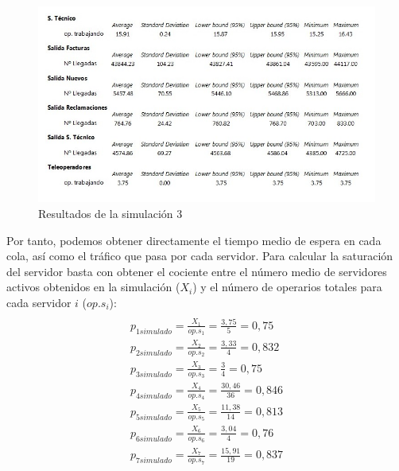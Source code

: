 \begin{figure}[H]
\begin{center}
\centering
  \includegraphics[width=1\textwidth]{./images/foto3}
  \caption{Resultados de la simulación 3}
  \label{fig: Resultados de la simulacion 3}
\end{center}
\end{figure}
Por tanto, podemos obtener directamente el tiempo medio de espera en cada cola, así como el tráfico que pasa por cada servidor. Para calcular la saturación del servidor basta con obtener el cociente entre el número medio de servidores activos obtenidos en la simulación ($X_{i}$) y el número de operarios totales para cada servidor $i$ ($op.s_{i}$):
\begin{multline}\\
p_{1 simulado} = \frac{X_{1}}{op.s_{1}} = \frac{3,75}{5} = 0,75 \\
p_{2 simulado} = \frac{X_{2}}{op.s_{2}} = \frac{3,33}{4} = 0,832\\
p_{3 simulado} = \frac{X_{3}}{op.s_{3}} = \frac{3}{4} = 0,75\\
p_{4 simulado} = \frac{X_{4}}{op.s_{4}} = \frac{30,46}{36} = 0,846\\
p_{5 simulado} = \frac{X_{5}}{op.s_{5}} = \frac{11,38}{14} = 0,813\\
p_{6 simulado} = \frac{X_{6}}{op.s_{6}} = \frac{3,04}{4} = 0,76\\
p_{7 simulado} = \frac{X_{7}}{op.s_{7}} = \frac{15,91}{19} = 0,837\\
\end{multline}

